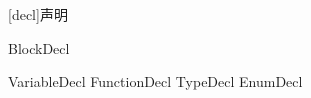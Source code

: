 
[decl]{声明}

\begin{bnf}
 \br
    BlockDecl \br
\end{bnf}

\begin{bnf}
 \br
    VariableDecl \br
    FunctionDecl \br
    TypeDecl \br
    EnumDecl \br
\end{bnf}
